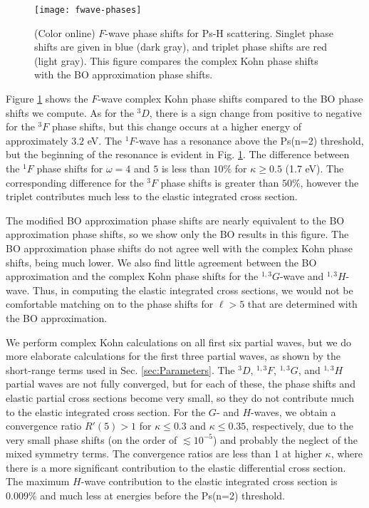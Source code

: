 \documentclass[preprint,showpacs,showkeys,preprintnumbers,amsmath,amssymb,longbibliography,pra,aps]{revtex4-1}
\begin{document}
{\begin{figure}[H]
	\centering
	\texttt{[image: fwave-phases]}
	\caption{(Color online) $F$-wave phase shifts for Ps-H scattering.
Singlet phase shifts are given in blue
(dark gray), and triplet phase shifts are red (light gray). This figure
compares the complex Kohn phase shifts with the BO approximation phase shifts.}
	\label{fig:fwave-phases}
\end{figure}

Figure \ref{fig:fwave-phases} shows the $F$-wave complex Kohn phase shifts 
compared to the BO phase shifts we compute. As for the $^3D$, there is a sign change 
from positive to negative for the $^3F$ phase shifts, but this change 
occurs at a higher energy of approximately $3.2$ eV. The $^1F$-wave has a 
resonance above the Ps(n=2) threshold, but the beginning of the resonance is 
evident in Fig. \ref{fig:fwave-phases}. The difference between the $^1F$ phase
shifts for $\omega = 4$ and $5$ is less than $10\%$ for $\kappa \geq 0.5$
(1.7 eV). The corresponding difference for the $^3F$ phase shifts is greater
than $50\%$, however the triplet contributes much less to the 
elastic integrated cross section.

The modified BO approximation phase shifts are nearly equivalent to
the BO approximation 
phase shifts, so we show only the BO results in this figure.
The BO approximation phase shifts do
not agree well with the complex Kohn phase shifts, being much lower. We 
also find little agreement between the BO approximation and the complex 
Kohn phase shifts for the $^{1,3}G$-wave and $^{1,3}H$-wave. Thus, in 
computing the elastic integrated cross sections, we would not be comfortable 
matching on to the phase shifts for $\ell > 5$ that are determined
with the BO approximation.

We perform complex Kohn calculations on all first six partial waves, but 
we do more elaborate calculations for the first three partial waves, as shown 
by the short-range terms used in Sec. \ref{sec:Parameters}.
The $^3D$, $^{1,3}F$, $^{1,3}G$, and $^{1,3}H$ partial waves are not fully
converged, but for each of these, the phase shifts and elastic partial cross 
sections become very small, so they do not contribute much to the elastic
integrated cross section.
For the $G$- and $H$-waves, we obtain a convergence ratio $R'(5) > 1$ for
$\kappa \leq 0.3$ and $\kappa \leq 0.35$, respectively, due to the very small
phase shifts (on the order of $\lesssim 10^{-5}$) and probably the neglect of
the mixed symmetry terms. The convergence ratios
are less than 1 at higher $\kappa$, where there is a more significant
contribution to the elastic differential cross section.
The maximum $H$-wave contribution to the elastic integrated cross
section is $0.009\%$ and much less at energies before the Ps(n=2)
threshold.

}
\end{document}
